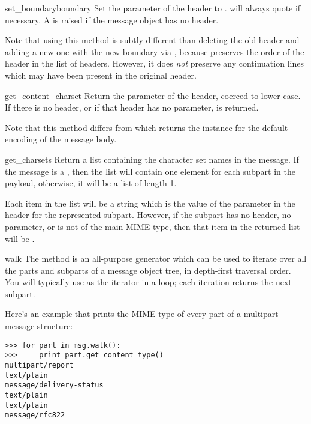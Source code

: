 \begin{methoddesc}[Message]{set_boundary}{boundary}
Set the  parameter of the 
header to .   will always quote
 if necessary.  A  is raised
if the message object has no  header.

Note that using this method is subtly different than deleting the old
 header and adding a new one with the new boundary
via , because  preserves the
order of the  header in the list of headers.
However, it does \emph{not} preserve any continuation lines which may
have been present in the original  header.
\end{methoddesc}

\begin{methoddesc}[Message]{get_content_charset}{}
Return the  parameter of the 
header, coerced to lower case.  If there is no
 header, or if that header has no
 parameter,  is returned.

Note that this method differs from  which
returns the  instance for the default encoding of the
message body.

\end{methoddesc}

\begin{methoddesc}[Message]{get_charsets}{}
Return a list containing the character set names in the message.  If
the message is a , then the list will contain one
element for each subpart in the payload, otherwise, it will be a list
of length 1.

Each item in the list will be a string which is the value of the
 parameter in the  header for the
represented subpart.  However, if the subpart has no
 header, no  parameter, or is not of
the  main MIME type, then that item in the returned list
will be .
\end{methoddesc}

\begin{methoddesc}[Message]{walk}{}
The  method is an all-purpose generator which can be
used to iterate over all the parts and subparts of a message object
tree, in depth-first traversal order.  You will typically use
 as the iterator in a  loop; each
iteration returns the next subpart.

Here's an example that prints the MIME type of every part of a
multipart message structure:

\begin{verbatim}
>>> for part in msg.walk():
>>>     print part.get_content_type()
multipart/report
text/plain
message/delivery-status
text/plain
text/plain
message/rfc822
\end{verbatim}
\end{methoddesc}

